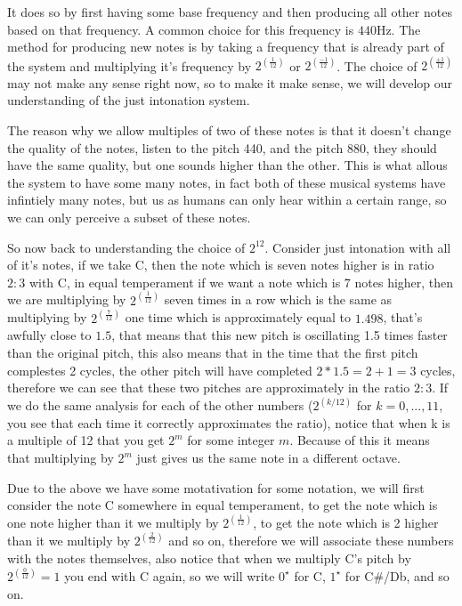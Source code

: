 It does so by first having some base frequency and then producing all other notes based on that frequency. A common choice for this frequency is $440\text{Hz}$. The method for producing new notes is by taking a frequency that is already part of the system and multiplying it's frequency by $2^(\frac{1}{12})$ or $2^(\frac{-1}{12})$. The choice of $2^(\frac{\pm1}{12})$ may not make any sense right now, so to make it make sense, we will develop our understanding of the just intonation system.


The reason why we allow multiples of two of these notes is that it doesn't change the quality of the notes, listen to the pitch 440, and the pitch 880, they should have the same quality, but one sounds higher than the other. This is what allous the system to have some many notes, in fact both of these musical systems have infintiely many notes, but us as humans can only hear within a certain range, so we can only perceive a subset of these notes.

So now back to understanding the choice of $2^12$. Consider just intonation with all of it's notes, if we take C, then the note which is seven notes higher is in ratio $2:3$ with C, in equal temperament if we want a note which is 7 notes higher, then we are multiplying by $2^(\frac{1}{12})$ seven times in a row which is the same as multiplying by $2^(\frac{7}{12})$ one time which is approximately equal to $1.498$, that's awfully close to $1.5$, that means that this new pitch is oscillating 1.5 times faster than the original pitch, this also means that in the time that the first pitch complestes 2 cycles, the other pitch will have completed $2 * 1.5 = 2 + 1 = 3$ cycles, therefore we can see that these two pitches are approximately in the ratio $2:3$. If we do the same analysis for each of the other numbers ($2^(k/12)$ for $k = 0, ..., 11$, you see that each time it correctly approximates the ratio), notice that when k is a multiple of 12 that you get $2^m$ for some integer $m$. Because of this it means that multiplying by $2^m$ just gives us the same note in a different octave.

Due to the above we have some motativation for some notation, we will first consider the note C somewhere in equal temperament, to get the note which is one note higher than it we multiply by $2^(\frac{1}{12})$, to get the note which is 2 higher than it we multiply by $2^(\frac{2}{12})$ and so on, therefore we will associate these numbers with the notes themselves, also notice that when we multiply C's pitch by $2^(\frac{0}{12}) = 1$ you end with C again, so we will write $0^{\star}$ for C, $1^{\star}$ for C\#/Db,  and so on.

